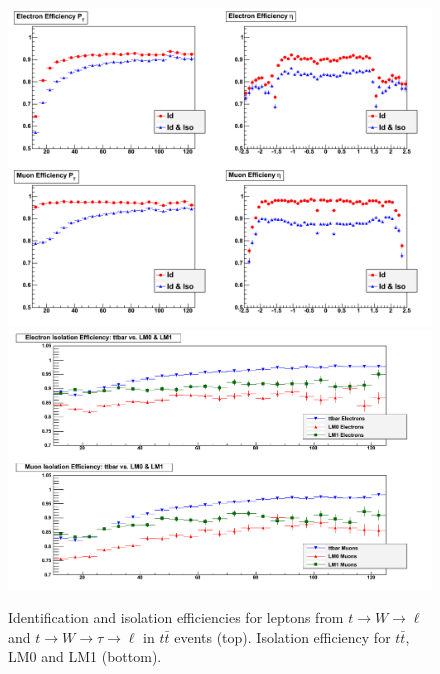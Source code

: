 \begin{figure}[tbh]
\begin{center}
\includegraphics[width=1.0\linewidth]{ttdilD6T_eff_Dec02_38X.png}
\includegraphics[width=1.0\linewidth]{lm_eff_Dec02_38X.png}
\caption{\label{fig:effttbar}\protect 
Identification and isolation efficiencies for leptons from $t \to W \to \ell$ and 
$t \to W \to \tau \to \ell$ in $t\bar{t}$ events (top). Isolation efficiency
for $t\bar{t}$, LM0 and LM1 (bottom).}
\end{center}
\end{figure}


